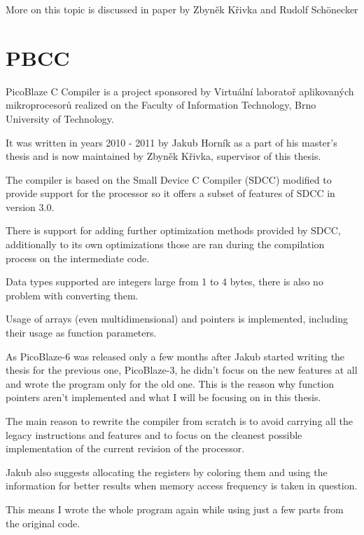     More on this topic is discussed in paper by Zbyněk Křivka and Rudolf Schönecker %



    \section{PBCC}\label{prev_pbcc}


    PicoBlaze C Compiler is a project sponsored by Virtuální laboratoř aplikovaných mikroprocesorů %
    realized on the Faculty of Information Technology, Brno University of Technology.

    It was written in years 2010 - 2011 by Jakub Horník as a part of his master's thesis and is now maintained by Zbyněk Křivka, supervisor of this thesis.

    The compiler is based on the Small Device C Compiler (SDCC) modified to provide support for the processor so it offers a subset of features of SDCC in version 3.0.

    There is support for adding further optimization methods provided by SDCC, additionally to its own optimizations those are ran during the compilation process on the intermediate code.

    Data types supported are integers large from 1 to 4 bytes, there is also no problem with converting them.

    Usage of arrays (even multidimensional) and pointers is implemented, including their usage as function parameters.

    As PicoBlaze-6 was released only a few months after Jakub started writing the thesis for the previous one, PicoBlaze-3, he didn't focus on the new features at all and wrote the program only for the old one. This is the reason why function pointers aren't implemented and what I will be focusing on in this thesis.

    The main reason to rewrite the compiler from scratch is to avoid carrying all the legacy instructions and features and to focus on the cleanest possible implementation of the current revision of the processor.

    Jakub also suggests allocating the registers by coloring them and using the information for better results when memory access frequency is taken in question.

    This means I wrote the whole program again while using just a few parts from the original code.

